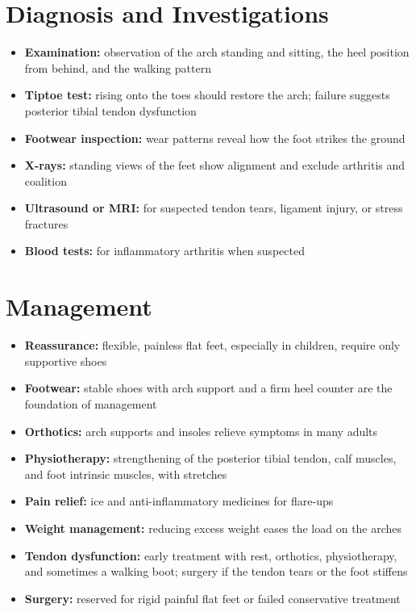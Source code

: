 \section*{Diagnosis and Investigations}
\begin{itemize}
    \item \textbf{Examination:} observation of the arch standing and sitting, the heel position from behind, and the walking pattern
    \item \textbf{Tiptoe test:} rising onto the toes should restore the arch; failure suggests posterior tibial tendon dysfunction
    \item \textbf{Footwear inspection:} wear patterns reveal how the foot strikes the ground
    \item \textbf{X-rays:} standing views of the feet show alignment and exclude arthritis and coalition
    \item \textbf{Ultrasound or MRI:} for suspected tendon tears, ligament injury, or stress fractures
    \item \textbf{Blood tests:} for inflammatory arthritis when suspected
\end{itemize}

\section*{Management}
\begin{itemize}
    \item \textbf{Reassurance:} flexible, painless flat feet, especially in children, require only supportive shoes
    \item \textbf{Footwear:} stable shoes with arch support and a firm heel counter are the foundation of management
    \item \textbf{Orthotics:} arch supports and insoles relieve symptoms in many adults
    \item \textbf{Physiotherapy:} strengthening of the posterior tibial tendon, calf muscles, and foot intrinsic muscles, with stretches
    \item \textbf{Pain relief:} ice and anti-inflammatory medicines for flare-ups
    \item \textbf{Weight management:} reducing excess weight eases the load on the arches
    \item \textbf{Tendon dysfunction:} early treatment with rest, orthotics, physiotherapy, and sometimes a walking boot; surgery if the tendon tears or the foot stiffens
    \item \textbf{Surgery:} reserved for rigid painful flat feet or failed conservative treatment
\end{itemize}

